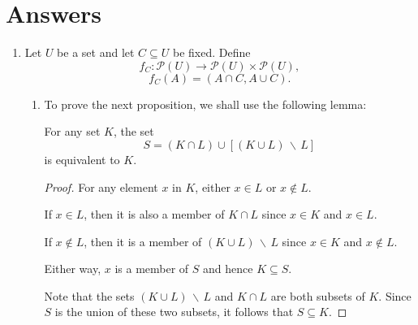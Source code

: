 
\maketitle
\newpage

\section*{Answers}

\bigskip

\begin{enumerate}

    \item Let $U$ be a set and let $C \subseteq U$ be fixed.
        Define
        \[ f_C: \mathcal{P}(U) \to \mathcal{P}(U) \times \mathcal{P}(U), \]
        \[ f_C(A) = \left(A \cap C, A \cup C\right). \]

        \bigskip

        \begin{enumerate}

            \item

                To prove the next proposition, we shall use the following lemma:
                \begin{lemma} \label{lem:1a-1}
                    For any set $K$, the set
                    \[ S = (K \cap L) \cup \left[(K \cup L) \, \backslash \, L\right] \]
                    is equivalent to $K$.
                \end{lemma}

                \medskip

                \begin{proof}
                    For any element $x$ in $K$, either $x \in L$ or $x \notin L$.

                    \smallskip

                    If $x \in L$, then it is also a member of $K \cap L$ since $x \in K$ and $x \in L$.

                    If $x \notin L$, then it is a member of $(K \cup L) \, \backslash \, L$ since $x \in K$ and $x \notin L$.

                    Either way, $x$ is a member of $S$ and hence $K \subseteq S$.

                    \smallskip

                    Note that the sets $(K \cup L) \, \backslash \, L$ and $K \cap L$ are both subsets of $K$.
                    Since $S$ is the union of these two subsets, it follows that $S \subseteq K$.


\end{proof}
\end{enumerate}
\end{enumerate}
